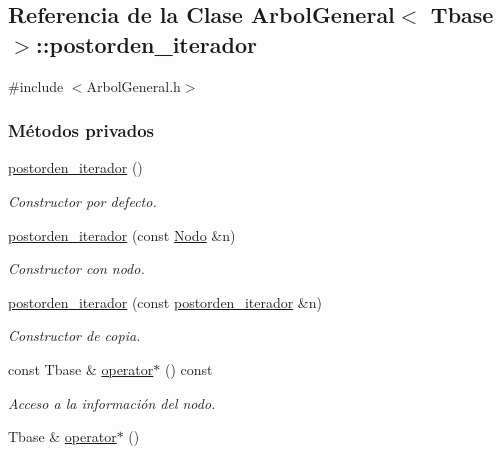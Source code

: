 \hypertarget{classArbolGeneral_1_1postorden__iterador}{}\subsection{Referencia de la Clase Arbol\+General$<$ Tbase $>$\+:\+:postorden\+\_\+iterador}
\label{classArbolGeneral_1_1postorden__iterador}


{\ttfamily \#include $<$Arbol\+General.\+h$>$}

\subsubsection*{Métodos privados}
\begin{DoxyCompactItemize}
\item 
\hyperlink{classArbolGeneral_1_1postorden__iterador_a2ac2dbbaf71087cf7d5964b45b4bca1e}{postorden\+\_\+iterador} ()
\begin{DoxyCompactList}\small\item\em Constructor por defecto. \end{DoxyCompactList}\item 
\hyperlink{classArbolGeneral_1_1postorden__iterador_a40c1929529a5d1063e97c07a73ecb043}{postorden\+\_\+iterador} (const \hyperlink{classArbolGeneral_a12cc1b74a9095d89bc7334290d332f7a}{Nodo} \&n)
\begin{DoxyCompactList}\small\item\em Constructor con nodo. \end{DoxyCompactList}\item 
\hyperlink{classArbolGeneral_1_1postorden__iterador_a07bc1d0276eb14be207144f0a69745d3}{postorden\+\_\+iterador} (const \hyperlink{classArbolGeneral_1_1postorden__iterador}{postorden\+\_\+iterador} \&n)
\begin{DoxyCompactList}\small\item\em Constructor de copia. \end{DoxyCompactList}\item 
const Tbase \& \hyperlink{classArbolGeneral_1_1postorden__iterador_a7416472d2c6f1ecf02262e79887f38ee}{operator$\ast$} () const 
\begin{DoxyCompactList}\small\item\em Acceso a la información del nodo. \end{DoxyCompactList}\item 
Tbase \& \hyperlink{classArbolGeneral_1_1postorden__iterador_af0f0fcc363dd30b5b0d102c1b60817c3}{operator$\ast$} ()

\end{DoxyCompactItemize}
